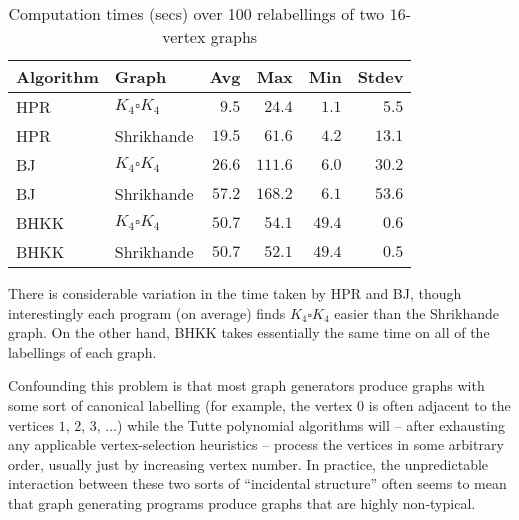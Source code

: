 \renewcommand{\arraystretch}{2}

\begin{table}
\begin{tabular}{llrrrr}
Algorithm & Graph & Avg & Max & Min & Stdev \\
\hline
HPR & $K_4 \square K_4$ & $9.5$ & $24.4$ & $1.1$ & $5.5$\\
HPR & Shrikhande & $19.5$ & $61.6$ & $4.2$ & $13.1$ \\
BJ & $K_4 \square K_4$ & $26.6$ & $111.6$ & $6.0$ & $30.2$\\
BJ & Shrikhande & $57.2$ & $168.2$ & $6.1$ & $53.6$\\
BHKK & $K_4 \square K_4$& $50.7$ & $54.1$ & $49.4$ & $0.6$\\
BHKK & Shrikhande & $50.7$ & $52.1$ & $49.4$ & $0.5$ \\
\end{tabular}
\caption{Computation times (secs) over 100 relabellings of two $16$-vertex graphs}
\label{timings}
\end{table}

There is considerable variation in the time taken by HPR and BJ, though interestingly each program (on average)
finds $K_4 \square K_4$ easier than the Shrikhande graph. On the other hand, BHKK takes essentially the 
same time on all of the labellings of each graph.




%

Confounding this problem is that most graph generators produce graphs with some sort of canonical labelling (for example, the vertex $0$ is often adjacent to the vertices $1$, $2$, $3$, $\ldots$) while the Tutte polynomial algorithms will -- after exhausting any applicable vertex-selection heuristics -- process the vertices in some arbitrary order, usually just by increasing vertex number. In practice, the unpredictable interaction between these two sorts of ``incidental structure'' often seems to mean that graph generating programs
produce graphs that are highly non-typical.  %

